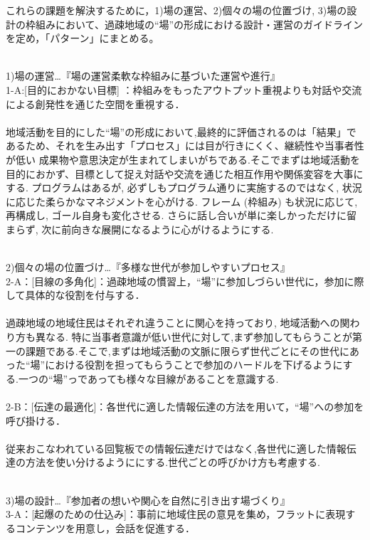 \documentclass[a4paper]{jsarticle}
\begin{document}
これらの課題を解決するために，1)場の運営、2)個々の場の位置づけ, 3)場の設計の枠組みにおいて、過疎地域の“場”の形成における設計・運営のガイドラインを定め，「パターン」にまとめる。\\\\

\item 1)場の運営…『場の運営柔軟な枠組みに基づいた運営や進行』\\
1-A:[目的におかない目標] ：枠組みをもったアウトプット重視よりも対話や交流による創発性を通じた空間を重視する．\\\\
地域活動を目的にした“場”の形成において,最終的に評価されるのは「結果」であるため、それを生み出す「プロセス」には目が行きにくく、継続性や当事者性が低い
成果物や意思決定が生まれてしまいがちである.そこでまずは地域活動を目的におかず、目標として捉え対話や交流を通じた相互作用や関係変容を大事にする. プログラムはあるが, 必ずしもプログラム通りに実施するのではなく, 状況に応じた柔らかなマネジメントを心がける. フレーム (枠組み) も状況に応じて,再構成し, ゴール自身も変化させる. さらに話し合いが単に楽しかっただけに留まらず, 次に前向きな展開になるように心がけるようにする.\\\\

\item 2)個々の場の位置づけ…『多様な世代が参加しやすいプロセス』\\
2-A：[目線の多角化]：過疎地域の慣習上，“場”に参加しづらい世代に，参加に際して具体的な役割を付与する．\\\\
過疎地域の地域住民はそれぞれ違うことに関心を持っており, 地域活動への関わり方も異なる. 特に当事者意識が低い世代に対して,まず参加してもらうことが第一の課題である.そこで,まずは地域活動の文脈に限らず世代ごとにその世代にあった“場”における役割を担ってもらうことで参加のハードルを下げるようにする.一つの“場”っであっても様々な目線があることを意識する.\\\\

2-B：[伝達の最適化]：各世代に適した情報伝達の方法を用いて，“場”への参加を呼び掛ける．\\\\
従来おこなわれている回覧板での情報伝達だけではなく,各世代に適した情報伝達の方法を使い分けるようににする.世代ごとの呼びかけ方も考慮する.\\\\


\item 3)場の設計…『参加者の想いや関心を自然に引き出す場づくり』\\
3-A：[起爆のための仕込み]：事前に地域住民の意見を集め，フラットに表現するコンテンツを用意し，会話を促進する．\\\\
\end{document}
